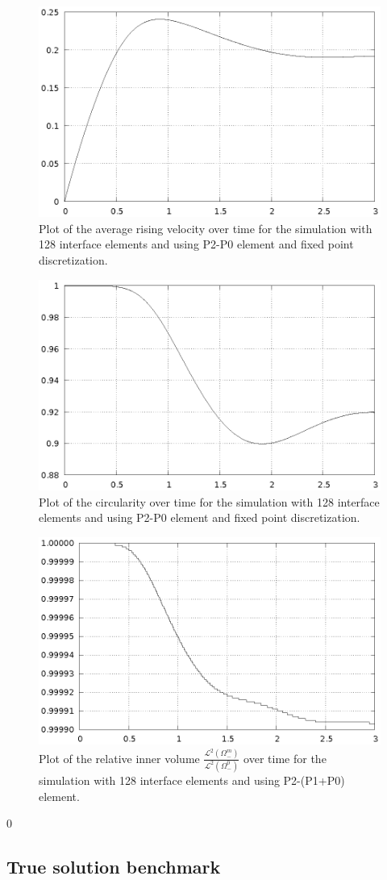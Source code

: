 \documentclass[a4paper,12pt,onecolumn]{article}
\begin{document}
\begin{figure}[htbp]
\centering
\includegraphics[width=.45\textwidth]
{figures/2d_benchmark1_velocity_p0_nonlinear_128.ps}
\caption{Plot of the average rising velocity over time for the simulation
with 128 interface elements and using P2-P0 element and fixed point
discretization.}
\label{fig:2d_benchmark1_velocity}
\end{figure}

\begin{figure}[htbp]
\centering
\includegraphics[width=.45\textwidth]
{figures/2d_benchmark1_circularity_p0_nonlinear_128.ps}
\caption{Plot of the circularity over time for the simulation with 128
interface elements and using P2-P0 element and fixed point discretization.}
\label{fig:2d_benchmark1_circularity}
\end{figure}

\begin{figure}[htbp]
\centering
\includegraphics[width=.45\textwidth]
{figures/2d_benchmark1_inner_volume_p1p0_128.ps}
\caption{Plot of the relative inner volume
$\frac{\mathcal{L}^2(\Omega^m_-)}{\mathcal{L}^2(\Omega^0_-)}$ over time for the
simulation with 128 interface elements and using P2-(P1+P0) element.}
\label{fig:2d_benchmark1_volume}
\end{figure}

\setcounter{equation} 0
\subsection{True solution benchmark}
\end{document}
